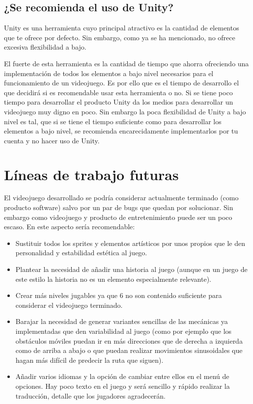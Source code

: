 \subsection{¿Se recomienda el uso de Unity?}
Unity es una herramienta cuyo principal atractivo es la cantidad de elementos que te ofrece por defecto. Sin embargo, como ya se ha mencionado, no ofrece excesiva flexibilidad a bajo.

El fuerte de esta herramienta es la cantidad de tiempo que ahorra ofreciendo una implementación de todos los elementos a bajo nivel necesarios para el funcionamiento de un videojuego. Es por ello que es el tiempo de desarrollo el que decidirá si es recomendable usar esta herramienta o no. Si se tiene poco tiempo para desarrollar el producto Unity da los medios para desarrollar un videojuego muy digno en poco. Sin embargo la poca flexibilidad de Unity a bajo nivel es tal, que si se tiene el tiempo suficiente como para desarrollar los elementos a bajo nivel, se recomienda encarecidamente implementarlos por tu cuenta y no hacer uso de Unity.

\section{Líneas de trabajo futuras}
El videojuego desarrollado se podría considerar actualmente terminado (como producto software) salvo por un par de bugs que quedan por solucionar. Sin embargo como videojuego y producto de entretenimiento puede ser un poco escaso.
En este aspecto sería recomendable:
\begin{itemize}
\item
Sustituir todos los sprites y elementos artísticos por unos propios que le den personalidad y estabilidad estética al juego.
\item
Plantear la necesidad de añadir una historia al juego (aunque en un juego de este estilo la historia no es un elemento especialmente relevante).
\item
Crear más niveles jugables ya que 6 no son contenido suficiente para considerar el videojuego terminado.
\item
Barajar la necesidad de generar variantes sencillas de las mecánicas ya implementadas que den variabilidad al juego (como por ejemplo que los obstáculos móviles puedan ir en más direcciones que de derecha a izquierda como de arriba a abajo o que puedan realizar movimientos sinusoidales que hagan más difícil de predecir la ruta que siguen).
\item
Añadir varios idiomas y la opción de cambiar entre ellos en el menú de opciones. Hay poco texto en el juego y será sencillo y rápido realizar la traducción, detalle que los jugadores agradecerán.
\end{itemize}

